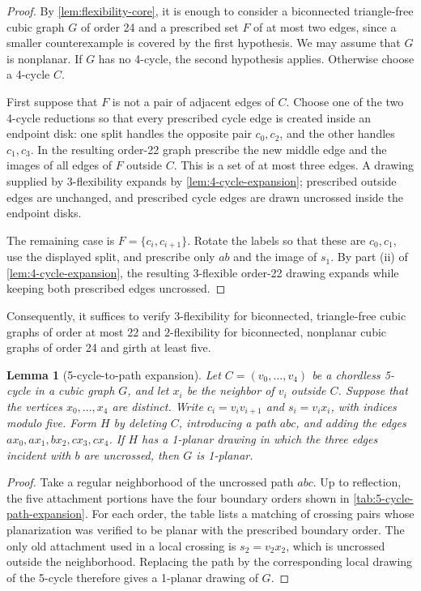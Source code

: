 \documentclass[a4paper,11pt]{article}
\theoremstyle{plain}
\newtheorem{lemma}{Lemma}
\theoremstyle{definition}  %
\begin{document}
\begin{proof}
    By \cref{lem:flexibility-core}, it is enough to consider a biconnected
    triangle-free cubic graph $G$ of order 24 and a prescribed set $F$ of at
    most two edges, since a smaller counterexample is covered by the first
    hypothesis.  We may assume that $G$ is nonplanar.  If $G$ has no 4-cycle,
    the second hypothesis applies.  Otherwise choose a 4-cycle $C$.

    First suppose that $F$ is not a pair of adjacent edges of $C$.  Choose
    one of the two 4-cycle reductions so that every prescribed cycle
    edge is created inside an endpoint disk: one split handles the opposite
    pair $c_0,c_2$, and the other handles $c_1,c_3$.  In the resulting
    order-22 graph prescribe the new middle edge and the images of all edges
    of $F$ outside $C$.  This is a set of at most three edges.  A drawing
    supplied by $3$-flexibility expands by \cref{lem:4-cycle-expansion};
    prescribed outside edges are unchanged, and prescribed cycle edges are
    drawn uncrossed inside the endpoint disks.

    The remaining case is $F=\{c_i,c_{i+1}\}$.  Rotate the labels so that
    these are $c_0,c_1$, use the displayed split, and prescribe only $ab$ and
    the image of $s_1$.  By part (ii) of \cref{lem:4-cycle-expansion}, the
    resulting $3$-flexible order-22 drawing expands while keeping both
    prescribed edges uncrossed.
\end{proof}

Consequently, it suffices to verify $3$-flexibility for biconnected,
triangle-free cubic graphs of order at most 22 and $2$-flexibility for
biconnected, nonplanar cubic graphs of order 24 and girth at least five.

\begin{lemma}[5-cycle-to-path expansion]\label{lem:5-cycle-path-expansion}
    Let $C=(v_0,\ldots,v_4)$ be a chordless 5-cycle in a cubic graph $G$,
    and let $x_i$ be the neighbor of $v_i$ outside $C$.  Suppose that the
    vertices $x_0,\ldots,x_4$ are distinct.  Write $c_i=v_iv_{i+1}$ and
    $s_i=v_ix_i$, with indices modulo five.  Form $H$ by deleting $C$,
    introducing a path $abc$, and adding the edges
    $ax_0,ax_1,bx_2,cx_3,cx_4$.  If $H$ has a 1-planar drawing in which the
    three edges incident with $b$ are uncrossed, then $G$ is 1-planar.
\end{lemma}

\begin{proof}
    Take a regular neighborhood of the uncrossed path $abc$.  Up to
    reflection, the five attachment portions have the four boundary orders
    shown in \cref{tab:5-cycle-path-expansion}.  For each order, the table
    lists a matching of crossing pairs whose planarization was verified to be
    planar with the prescribed boundary order.  The only old attachment used
    in a local crossing is $s_2=v_2x_2$, which is uncrossed outside the
    neighborhood.  Replacing the path by the corresponding local drawing of
    the 5-cycle therefore gives a 1-planar drawing of $G$.
\end{proof}
\end{document}
